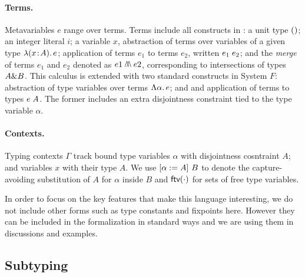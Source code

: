 \paragraph{Terms.} 
Metavariables $e$ range over terms.  
Terms include all constructs in \name: a unit type $()$; an integer literal $i$; 
a variable $x$, abstraction of terms over variables of
a given type $\lambda (x \!:\! A).\, e$; application of terms $e_1$ to terms $e_2$, written
$e_1 \; e_2$; and the \emph{merge} of terms $e_1$ and $e_2 $ denoted as 
$e1 \merge e2$, corresponding to intersections of types $A \& B$.
This calculus is extended with two standard constructs in System $F$:
abstraction of type variables over terms $\Lambda \alpha.\, e$; and
and application of terms to types $e \; A$. 
The former includes an extra disjointness constraint tied to the type 
variable $\alpha$.

\paragraph{Contexts.} Typing contexts $ \Gamma $ track bound type variables
$\alpha$ with disjointness cosntraint $A$; and variables $x$ with their type $A$. 
We use $\lbrack \alpha := A \rbrack~ {B}$
to denote the capture-avoiding substitution of $A$ for $\alpha$ inside $B$ and
$\textsf{ftv}(\cdot)$ for sets of free type variables. %

In order to focus on the key features that make this language interesting, we do
not include other forms such as type constants and fixpoints here. 
However they can be included in the formalization in
standard ways and we are using them in discussions and examples. %


\subsection{Subtyping}



